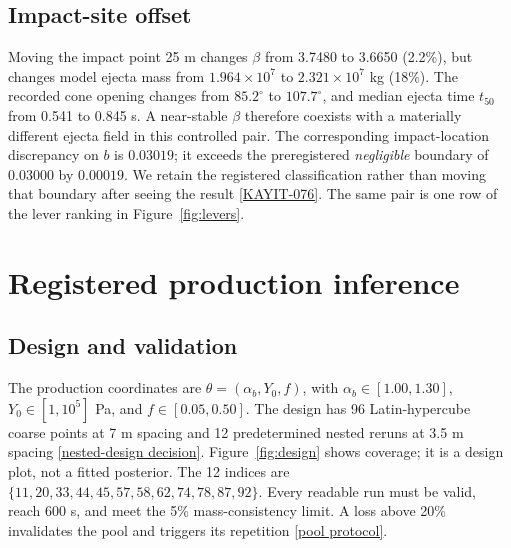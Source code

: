 \documentclass[10pt,twocolumn]{article}
\newcommand{\Yzero}{Y_0}
\newcommand{\aB}{\alpha_b}
\newcommand{\repo}[2]{\href{https://github.com/Yagiz-D-Ekrem-Dolar/dart-rift/blob/a35dab4/#1}{#2}}
\begin{document}
\subsection{Impact-site offset}
Moving the impact point 25 m changes $\beta$ from 3.7480 to 3.6650
(2.2\%), but changes model ejecta mass from
$1.964\times10^7$ to $2.321\times10^7$ kg (18\%).
The recorded cone opening changes from $85.2^\circ$ to
$107.7^\circ$, and median ejecta time $t_{50}$ from 0.541 to
0.845 s. A near-stable $\beta$ therefore coexists with a
materially different ejecta field in this controlled pair.
The corresponding impact-location discrepancy on $b$ is
$0.03019$; it exceeds the preregistered \emph{negligible}
boundary of $0.03000$ by $0.00019$. We retain the registered
classification rather than moving that boundary after seeing
the result \repo{docs/defter/KAYIT-076_2026-10-06_DO-DC-DN-uc-kilitli-yargi.md}{[KAYIT-076]}.
The same pair is one row of the lever ranking in
Figure~\ref{fig:levers}.

\section{Registered production inference}
\subsection{Design and validation}
The production coordinates are
$\theta=(\aB,\Yzero,f)$, with
$\aB\in[1.00,1.30]$, $\Yzero\in[1,10^5]$ Pa,
and $f\in[0.05,0.50]$. The design has 96 Latin-hypercube
coarse points at 7 m spacing and 12 predetermined nested
reruns at 3.5 m spacing
\repo{docs/adr/ADR-0059-cok-dogruluklu-vekilin-geri-alinmasi.md}{[nested-design decision]}.
Figure~\ref{fig:design} shows coverage; it is a design plot,
not a fitted posterior. The 12 indices are
$\{11,20,33,44,45,57,58,62,74,78,87,92\}$.
Every readable run must be valid, reach 600 s, and meet the
5\% mass-consistency limit. A loss above 20\% invalidates
the pool and triggers its repetition
\repo{docs/truba/PROTOKOL-HAVUZ-URETIM.md}{[pool protocol]}.
\end{document}
